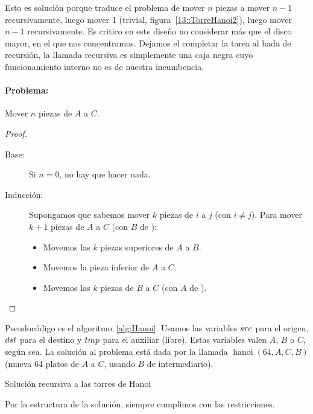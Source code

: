   Esto es solución porque traduce el problema de mover \(n\) piezas
  a mover \(n - 1\) recursivamente,
  luego mover \num{1}
  (trivial, figura~\ref{13::TorreHanoi2}),
  luego mover \(n - 1\) recursivamente.
  Es critico en este diseño no considerar más que el disco mayor,
  en el que nos concentramos.
  Dejamos el completar la tarea al hada de recursión,
  la llamada recursiva es simplemente una caja negra
  cuyo funcionamiento interno no es de nuestra incumbencia.

\paragraph{Problema:}

  Mover \(n\) piezas de \(A\) a \(C\).

  \begin{proof}
    \begin{description}
    \item[Base:]
      Si \(n = 0\),
      no hay que hacer nada.
    \item[Inducción:]
      Supongamos que sabemos mover \(k\) piezas de \(i\) a \(j\)
      (con \(i \ne j\)).
      Para mover \(k + 1\) piezas de \(A\) a \(C\)
      (con \(B\) de ):
      \begin{itemize}
      \item
        Movemos las \(k\) piezas superiores de \(A\) a \(B\).
      \item
        Movemos la pieza inferior de \(A\) a \(C\).
      \item
        Movemos las \(k\) piezas de \(B\) a \(C\)
        (con \(A\) de ).
      \end{itemize}
    \end{description}
  \end{proof}
  Pseudocódigo es el algoritmo~\ref{alg:Hanoi}.
  Usamos las variables \(\mathnormal{src}\) para el origen,
  \(\mathnormal{dst}\) para el destino
  y \(\mathnormal{tmp}\) para el auxiliar
  (libre).
  Estas variables valen \(A\), \(B\) o \(C\),
  según sea.
  La solución al problema está dada por la llamada
  \(\mathop{hanoi}(64, A, C, B)\)
  (mueva \num{64} platos de \(A\) a \(C\),
   usando \(B\) de intermediario).
  \begin{algorithm}[ht]
    \DontPrintSemicolon\Indp

    \caption{Solución recursiva a las torres de Hanoi}
    \label{alg:Hanoi}
  \end{algorithm}
  Por la estructura de la solución,
  siempre cumplimos con las restricciones.

